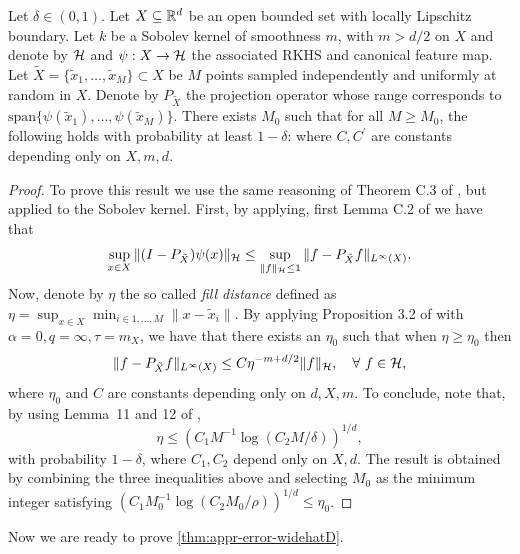 \begin{lemma}\label{lm:nystrom}
Let $\delta \in (0,1)$. Let $X \subseteq \mathbb R^d$ be an open bounded set with locally Lipschitz boundary. Let $k$ be a Sobolev kernel of smoothness $m$, with $m > d/2$ on $X$ and denote by $\mathcal H$ and $\psi:X\to\mathcal H$ the associated RKHS and canonical feature map. Let $\tilde{X} = \{\tilde{x}_1,\dots,\tilde{x}_M\} \subset X$ be $M$ points sampled independently and uniformly at random in $X$.
Denote by $P_{\tilde{X}}$ the projection operator whose range corresponds to $\textrm{span}\{\psi(\tilde{x}_1),\dots,\psi(\tilde{x}_M)\}$.
There exists $M_0$ such that for all $M \geq M_0$, the following holds with probability at least $1-\delta$:
where $C,C^\prime$ are constants depending only on $X, m, d$.
\end{lemma}
\begin{proof}
To prove this result we use the same reasoning of Theorem C.3 of \citet{rudi2021psd}, but applied to the Sobolev kernel. First, by applying, first Lemma C.2 of \citet{rudi2021psd}  we have that
$$\sup_{x \in X}\|(I-P_{\tilde{X}})\psi(x)\|_{\mathcal H} \leq \sup_{\|f\|_{\mathcal H} \leq 1} \|f-P_{\tilde{X}}f\|_{L^\infty(X)}.$$
Now, denote by $\eta$ the so called {\em fill distance} \citep{narcowich2005sobolev} defined as $\eta = \sup_{x \in X}\min_{i \in {1,\dots, M}} \|x - \tilde{x}_i\|$.
By applying Proposition 3.2 of \citet{narcowich2005sobolev} with $\alpha = 0, q = \infty, \tau = m_X$, we have that  there exists an $\eta_0$ such that when $\eta \geq \eta_0$ then
$$
\|f-P_{\tilde{X}}f\|_{L^\infty(X)} \leq  C \eta^{-m+d/2}\|f\|_\mathcal H, \quad \forall ~ f \in \mathcal H,
$$
where $\eta_0$ and $C$ are constants depending only on $d,X,m$.
To conclude, note that, by using Lemma~11 and 12 of \citet{vacher2021dimension},
$$\eta \leq (C_1 M^{-1} \log(C_2 M/\delta))^{1/d},$$
with probability $1-\delta$, where $C_1,C_2$ depend only on $X,d$. The result is obtained by combining the three inequalities above and selecting $M_0$ as the minimum integer satisfying $(C_1 M_0^{-1} \log(C_2 M_0/\rho))^{1/d} \leq \eta_0$.
\end{proof}

Now we are ready to prove \cref{thm:appr-error-widehatD}.

